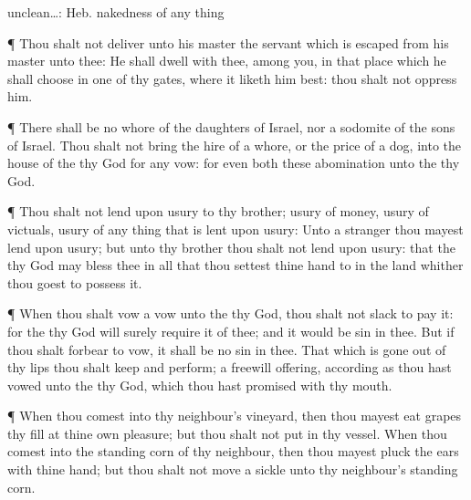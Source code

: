 {{unclean…: Heb. nakedness of any thing}
\par }{\PP {}¶ Thou shalt not
deliver unto his
master the
servant which is
escaped from his
master unto thee:
He shall
dwell with thee,
{}
among you, in that
place which he shall
choose in
one of thy
gates, where it liketh him
best: thou shalt not
oppress him.
\par }{\PP {}¶ There shall be no
whore of the
daughters of
Israel, nor a
sodomite of the
sons of
Israel.
Thou shalt not
bring the
hire of a
whore, or the
price of a
dog, into the
house of the
{} thy
God for any
vow: for even
both these
{}
abomination unto the
{} thy
God.
\par }{\PP {}¶ Thou shalt not lend upon
usury to thy
brother;
usury of
money,
usury of
victuals,
usury of any
thing that is lent upon
usury:
Unto a
stranger thou mayest lend upon
usury; but unto thy
brother thou shalt not lend upon
usury: that the
{} thy
God may
bless thee in all that thou
settest thine
hand to in the
land whither thou
goest to
possess it.
\par }{\PP {}¶ When thou shalt
vow a
vow unto the
{} thy
God, thou shalt not
slack to
pay it: for the
{} thy
God will
surely
require it of thee; and it would be
sin in thee.
But if thou shalt
forbear to
vow, it shall be no
sin in thee.
That which is gone
out of thy
lips thou shalt
keep and
perform;
{} a freewill
offering, according as thou hast
vowed unto the
{} thy
God, which thou hast
promised with thy
mouth.
\par }{\PP {}¶ When thou
comest into thy
neighbour’s
vineyard, then thou mayest
eat
grapes thy
fill at thine own
pleasure; but thou shalt not
put
{} in thy
vessel.
When thou
comest into the standing
corn of thy
neighbour, then thou mayest
pluck the
ears with thine
hand; but thou shalt not
move a
sickle unto thy
neighbour’s standing
corn.

}
